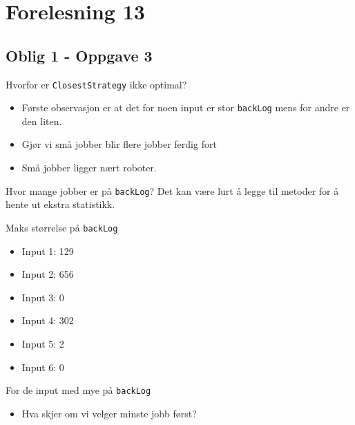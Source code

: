 \documentclass{article} 
\begin{document}
    \section{Forelesning 13}

    \subsection{Oblig 1 - Oppgave 3}
    Hvorfor er \texttt{ClosestStrategy} ikke optimal?

    \begin{itemize}
        \item Første observasjon er at det for noen input er stor \texttt{backLog} mens for andre er den liten.
        \item Gjør vi små jobber blir flere jobber ferdig fort
        \item Små jobber ligger nært roboter.
    \end{itemize}

    Hvor mange jobber er på \texttt{backLog}? Det kan være lurt å legge til metoder for å hente ut ekstra statistikk.

    Maks størrelse på \texttt{backLog}

    \begin{itemize}
        \item Input 1: 129
        \item Input 2: 656
        \item Input 3: 0
        \item Input 4: 302
        \item Input 5: 2
        \item Input 6: 0
    \end{itemize}

    For de input med mye på \texttt{backLog}
    \begin{itemize}
        \item Hva skjer om vi velger minste jobb først?
    \end{itemize}
\end{document}
